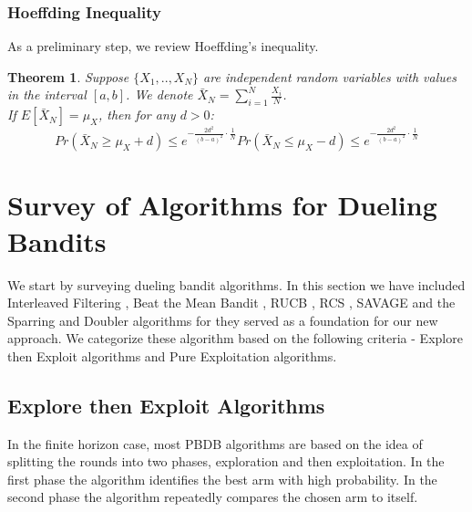 \documentclass[MSc,beforeExam]{iitcsthesis}
\newtheorem{theorem}{Theorem}
\begin{document}
	\subsection{Hoeffding Inequality}
	As a preliminary step, we review Hoeffding's inequality.
	\begin{theorem}\cite{Hoeffding}\label{thm:Hoeffding}
	Suppose $\{X_1,..,X_N \}$ are independent random variables with values in the interval $[a,b]$.
	We denote $\bar{X}_N = \sum_{i=1}^N \frac{X_i}{N}$.\\
	If $E[\bar{X}_N] = \mu_X$, then for any $d>0$:
	\begin{subequations}
	\begin{equation}
	Pr(\bar{X}_N \geq \mu_X+ d) \leq e^{-\frac{2d^2}{(b-a)^2}\cdot\frac{1}{N}}
	\end{equation}
	\begin{equation}
	Pr(\bar{X}_N \leq \mu_X- d) \leq e^{-\frac{2d^2}{(b-a)^2}\cdot\frac{1}{N}}
	\end{equation}
	\end{subequations}
	\end{theorem}

\chapter{Survey of Algorithms for Dueling Bandits}
	We start by surveying dueling bandit algorithms. In this section we have included Interleaved Filtering \cite{yue2012k}, Beat the Mean Bandit \cite{yue2011beat}, RUCB \cite{zoghi2013relative}, RCS \cite{zoghi2014relative}, SAVAGE \cite{urvoy2013generic} and the Sparring and Doubler algorithms \cite{ailon2014reducing} for they served as a foundation for our new approach. We categorize these algorithm based on the following criteria - Explore then Exploit algorithms and Pure Exploitation algorithms.

\section{Explore then  Exploit Algorithms}
	In the finite horizon case, most PBDB algorithms are based on the idea of splitting the rounds into two phases, exploration and then exploitation. In the first phase the algorithm identifies the best arm with high probability. In the second phase the algorithm repeatedly compares the chosen arm to itself.
	
\end{document}
